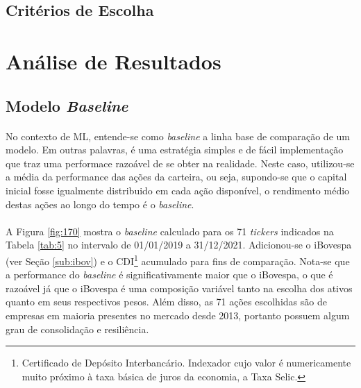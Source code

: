 \subsection{Critérios de Escolha}
\paragraph{}






\section{Análise de Resultados}


\subsection{Modelo \textit{Baseline}}
\label{sub:baseline}

\paragraph{} No contexto de ML, entende-se como \textit{baseline} a linha base de comparação de um modelo. Em outras palavras, é uma estratégia simples e de fácil implementação que traz uma performace razoável de se obter na realidade. Neste caso, utilizou-se a média da performance das ações da carteira, ou seja, supondo-se que o capital inicial fosse igualmente distribuido em cada ação disponível, o rendimento médio destas ações ao longo do tempo é o \textit{baseline}.

\paragraph{} A Figura \ref{fig:170} mostra o \textit{baseline} calculado para os 71 \textit{tickers} indicados na Tabela \ref{tab:5} no intervalo de 01/01/2019 a 31/12/2021. Adicionou-se o iBovespa (ver Seção \ref{sub:ibov}) e o CDI\footnote{Certificado de Depósito Interbancário. Indexador cujo valor é numericamente muito próximo à taxa básica de juros da economia, a Taxa Selic.} acumulado para fins de comparação. Nota-se que a performance do \textit{baseline} é significativamente maior que o iBovespa, o que é razoável já que o iBovespa é uma composição variável tanto na escolha dos ativos quanto em seus respectivos pesos. Além disso, as 71 ações escolhidas são de empresas em maioria presentes no mercado desde 2013, portanto possuem algum grau de consolidação e resiliência.

